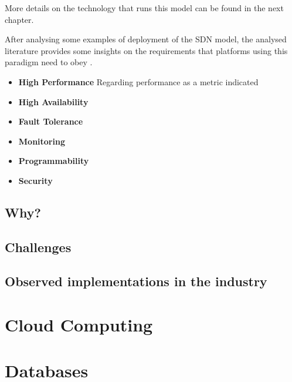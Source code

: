 \par More details on the technology that runs this model can be found in the next chapter. 
\par After analysing some examples of deployment of the SDN model, the analysed literature provides some insights on the requirements that platforms using this paradigm need to obey \cite {masutani_requirements_2014}.
 
\begin {itemize} 
    \item \textbf{High Performance}  Regarding performance as a metric indicated  
    \item \textbf{High Availability} 
    \item \textbf{Fault Tolerance}   
    \item \textbf{Monitoring}   
    \item \textbf{Programmability}   
    \item \textbf{Security}   
\end {itemize}



\subsection {Why?}
\subsection {Challenges}
\subsection {Observed implementations in the industry}

\section {Cloud Computing}
\section {Databases} 

